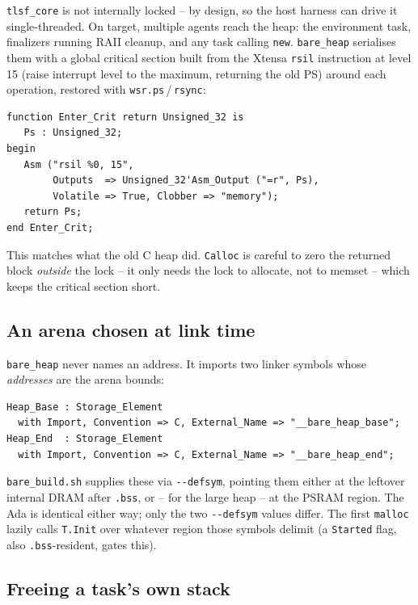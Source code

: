 \texttt{tlsf\_core} is not internally locked -- by design, so the host harness
can drive it single-threaded. On target, multiple agents reach the heap: the
environment task, finalizers running RAII cleanup, and any task calling
\texttt{new}. \texttt{bare\_heap} serialises them with a global critical section
built from the Xtensa \texttt{rsil} instruction at level 15 (raise interrupt
level to the maximum, returning the old PS) around each operation, restored with
\texttt{wsr.ps}\,/\,\texttt{rsync}:

\begin{lstlisting}
function Enter_Crit return Unsigned_32 is
   Ps : Unsigned_32;
begin
   Asm ("rsil %0, 15",
        Outputs  => Unsigned_32'Asm_Output ("=r", Ps),
        Volatile => True, Clobber => "memory");
   return Ps;
end Enter_Crit;
\end{lstlisting}

This matches what the old C heap did. \texttt{Calloc} is careful to zero the
returned block \emph{outside} the lock -- it only needs the lock to allocate, not
to memset -- which keeps the critical section short.

\subsection{An arena chosen at link time}

\texttt{bare\_heap} never names an address. It imports two linker symbols whose
\emph{addresses} are the arena bounds:

\begin{lstlisting}
Heap_Base : Storage_Element
  with Import, Convention => C, External_Name => "__bare_heap_base";
Heap_End  : Storage_Element
  with Import, Convention => C, External_Name => "__bare_heap_end";
\end{lstlisting}

\texttt{bare\_build.sh} supplies these via \texttt{-{}-defsym}, pointing them
either at the leftover internal DRAM after \texttt{.bss}, or -- for the large
heap -- at the PSRAM region. The Ada is identical either way; only the two
\texttt{-{}-defsym} values differ. The first \texttt{malloc} lazily calls
\texttt{T.Init} over whatever region those symbols delimit (a \texttt{Started}
flag, also \texttt{.bss}-resident, gates this).

\subsection{Freeing a task's own stack}

